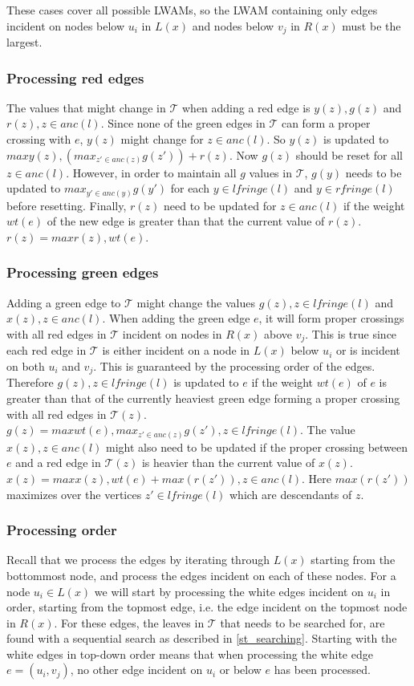 These cases cover all possible LWAMs, so the LWAM containing only edges incident on nodes below $u_i$ in $L(x)$ and nodes below $v_j$ in $R(x)$ must be the largest.

\subsubsection{Processing red edges}
The values that might change in $\mathcal{T}$ when adding a red edge is $y(z), g(z)$ and $r(z), z \in anc(l)$. Since none of the green edges in $\mathcal{T}$ can form a proper crossing with $e$, $y(z)$ might change for $z \in anc(l)$. So $y(z)$ is updated to $max{y(z), (max_{z' \in anc(z)} g(z')) + r(z)}$. Now $g(z)$ should be reset for all $z \in anc(l)$. However, in order to maintain all $g$ values in $\mathcal{T}$, $g(y)$ needs to be updated to $max_{y' \in anc(y)} g(y')$ for each $y \in lfringe(l)$ and $y \in rfringe(l)$ before resetting. Finally, $r(z)$ need to be updated for $z \in anc(l)$ if the weight $wt(e)$ of the new edge is greater than that the current value of $r(z)$. $r(z)=max{r(z), wt(e)}$.

\subsubsection{Processing green edges}
Adding a green edge to $\mathcal{T}$ might change the values $g(z), z \in lfringe(l)$ and $x(z), z \in anc(l)$. When adding the green edge $e$, it will form proper crossings with all red edges in $\mathcal{T}$ incident on nodes in $R(x)$ above $v_j$. This is true since each red edge in $\mathcal{T}$ is either incident on a node in $L(x)$ below $u_i$ or is incident on both $u_i$ and $v_j$. This is guaranteed by the processing order of the edges. Therefore $g(z), z \in lfringe(l)$ is updated to $e$ if the weight $wt(e)$ of $e$ is greater than that of the currently heaviest green edge forming a proper crossing with all red edges in $\mathcal{T}(z)$. $g(z)=max{wt(e), max_{z' \in anc(z)} g(z')}, z \in lfringe(l)$. The value $x(z), z \in anc(l)$ might also need to be updated if the proper crossing between $e$ and a red edge in $\mathcal{T}(z)$ is heavier than the current value of $x(z)$. $x(z)=max{x(z), wt(e) + max(r(z'))}, z \in anc(l)$. Here $max(r(z'))$ maximizes over the vertices $z' \in lfringe(l)$ which are descendants of $z$.

\subsubsection{Processing order}
Recall that we process the edges by iterating through $L(x)$ starting from the bottommost node, and process the edges incident on each of these nodes. For a node $u_i \in L(x)$ we will start by processing the white edges incident on $u_i$ in order, starting from the topmost edge, i.e. the edge incident on the topmost node in $R(x)$. For these edges, the leaves in $\mathcal{T}$ that needs to be searched for, are found with a sequential search as described in \ref{st_searching}. Starting with the white edges in top-down order means that when processing the white edge $e=(u_i,v_j)$, no other edge incident on $u_i$ or below $e$ has been processed.

